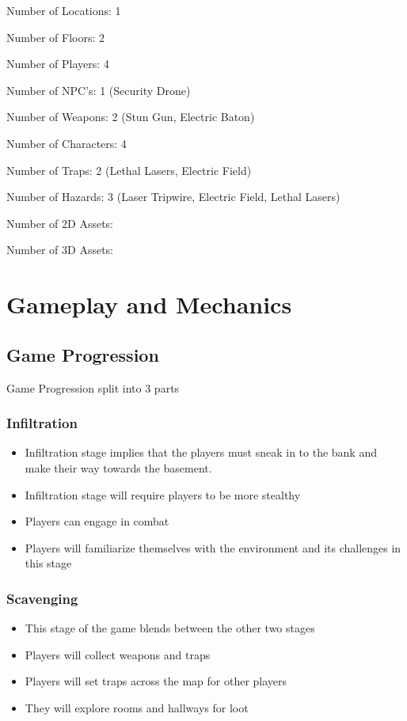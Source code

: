 \documentclass[14pt]{report}
\begin{document}
Number of Locations: 1

Number of Floors: 2

Number of Players: 4

Number of NPC's: 1 (Security Drone)

Number of Weapons: 2 (Stun Gun, Electric Baton)

Number of Characters: 4

Number of Traps: 2 (Lethal Lasers, Electric Field)

Number of Hazards: 3 (Laser Tripwire, Electric Field, Lethal Lasers)

Number of 2D Assets: 

Number of 3D Assets: 


\chapter{Gameplay and Mechanics}

\section{Game Progression}
Game Progression split into 3 parts

\subsection{Infiltration}
\begin{itemize}
    \item Infiltration stage implies that the players must sneak in to the bank and make their way towards the basement.
    \item Infiltration stage will require players to be more stealthy
    \item Players can engage in combat
    \item Players will familiarize themselves with the environment and its challenges in this stage
\end{itemize}
\subsection{Scavenging}
\begin{itemize}
    \item This stage of the game blends between the other two stages
    \item Players will collect weapons and traps
    \item Players will set traps across the map for other players
    \item They will explore rooms and hallways for loot 
\end{itemize}
\end{document}
